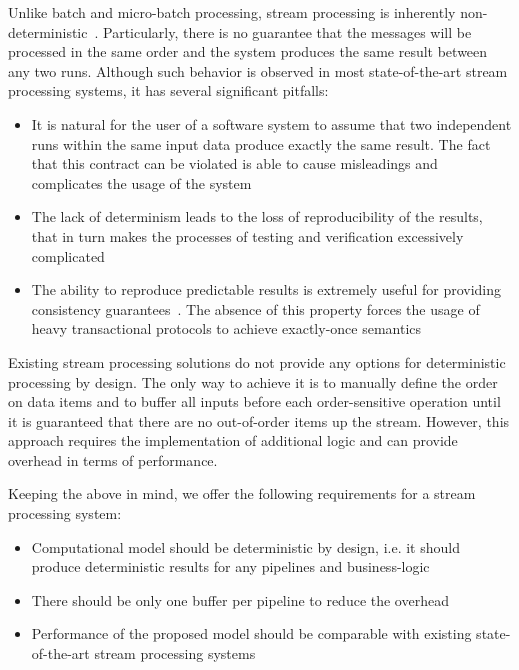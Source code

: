 
Unlike batch and micro-batch processing, stream processing is inherently non-deterministic~\cite{Zaharia:2012:DSE:2342763.2342773}. Particularly, there is no guarantee that the messages will be processed in the same order and the system produces the same result between any two runs. Although such behavior is observed in most state-of-the-art stream processing systems, it has several significant pitfalls:

\begin{itemize}
    \item It is natural for the user of a software system to assume that two independent runs within the same input data produce exactly the same result. The fact that this contract can be violated is able to cause misleadings and complicates the usage of the system
    \item The lack of determinism leads to the loss of reproducibility of the results, that in turn makes the processes of testing and verification excessively complicated
    \item The ability to reproduce predictable results is extremely useful for providing consistency guarantees~\cite{Stonebraker:2005:RRS:1107499.1107504}. The absence of this property forces the usage of heavy transactional protocols to achieve exactly-once semantics~\cite{Carbone:2017:SMA:3137765.3137777, jacques2016consistent} 
\end{itemize}

Existing stream processing solutions do not provide any options for deterministic processing by design. The only way to achieve it is to manually define the order on data items and to buffer all inputs before each order-sensitive operation until it is guaranteed that there are no out-of-order items up the stream. However, this approach requires the implementation of additional logic and can provide overhead in terms of performance.  

Keeping the above in mind, we offer the following requirements for a stream processing system:
\begin{itemize}
    \item Computational model should be deterministic by design, i.e. it should produce deterministic results for any pipelines and business-logic
    \item There should be only one buffer per pipeline to reduce the overhead
    \item Performance of the proposed model should be comparable with existing state-of-the-art stream processing systems
\end{itemize}
